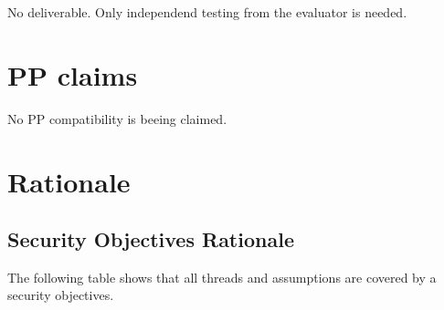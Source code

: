\documentclass[12pt,english]{scrbook}
\begin{document}
No deliverable. Only independend testing from the evaluator is needed.





\chapter{PP claims}

No PP compatibility is beeing claimed.




\chapter{Rationale}





\section{Security Objectives Rationale}

The following table shows that all threads and assumptions are covered
by a security objectives. 
\end{document}

